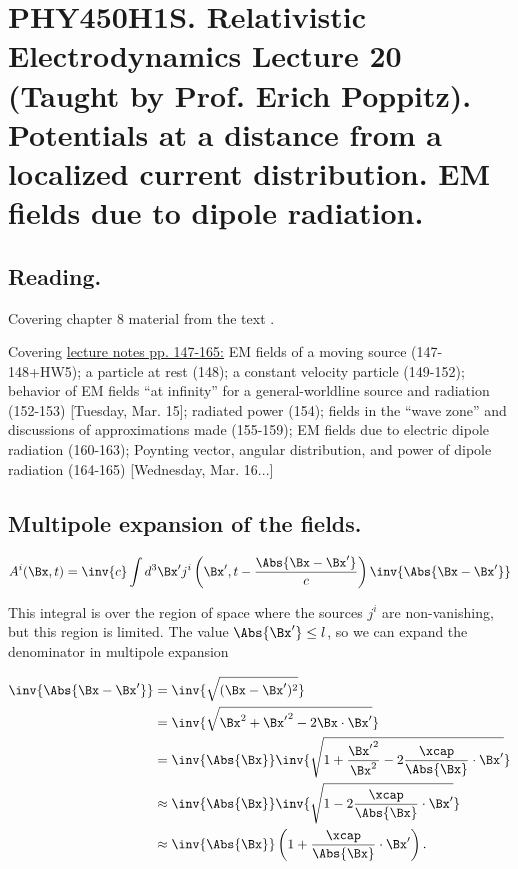 
%

\chapter{PHY450H1S.  Relativistic Electrodynamics Lecture 20 (Taught by Prof. Erich Poppitz).  Potentials at a distance from a localized current distribution.  EM fields due to dipole radiation.}
\label{chap:relativisticElectrodynamicsL20}
{}
\date{Mar 15, 2011}

\beginArtNoToc

\section{Reading.}

Covering chapter 8 material from the text \cite{landau1980classical}.

Covering \href{http://www.physics.utoronto.ca/~poppitz/epoppitz/PHY450_files/RelEMpp147-165.pdf}{lecture notes pp. 147-165:} EM fields of a moving source (147-148+HW5); a particle at rest (148); a constant velocity particle (149-152); behavior of EM fields ``at infinity'' for a general-worldline source and radiation (152-153) [Tuesday, Mar. 15]; radiated power (154); fields in the ``wave zone'' and discussions of approximations made (155-159); EM fields due to electric dipole radiation (160-163); Poynting vector, angular distribution, and power of dipole radiation (164-165) [Wednesday, Mar. 16...]

\section{Multipole expansion of the fields.}

\begin{equation}\label{eqn:relativisticElectrodynamicsL20:10}
A^i(\Bx, t) = \inv{c} \int d^3 \Bx' j^i\left(\Bx', t - \frac{\Abs{\Bx - \Bx'}}{c}\right) \inv{\Abs{\Bx - \Bx'}}
\end{equation}

This integral is over the region of space where the sources $j^i$ are non-vanishing, but this region is limited.  The value $\Abs{\Bx'} \le l$, so we can expand the denominator in multipole expansion

\begin{align*}
\inv{\Abs{\Bx - \Bx'}}
&=
\inv{\sqrt{(\Bx - \Bx')^2}} \\
&=
\inv{\sqrt{\Bx^2 + {\Bx'}^2 - 2 \Bx \cdot \Bx'}} \\
&=
\inv{\Abs{\Bx}} \inv{\sqrt{1 + \frac{{\Bx'}^2}{\Bx^2} - 2 \frac{\xcap}{\Abs{\Bx}} \cdot \Bx'}} \\
&\approx
\inv{\Abs{\Bx}} \inv{\sqrt{1 - 2 \frac{\xcap}{\Abs{\Bx}} \cdot \Bx'}} \\
&\approx
\inv{\Abs{\Bx}} \left(1 + \frac{\xcap}{\Abs{\Bx}} \cdot \Bx' \right).
\end{align*}

